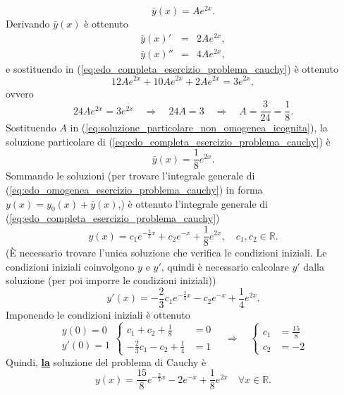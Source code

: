 \begin{example}
\begin{equation}
		\bar y(x) = A e^{2x}.
	\end{equation}
	Derivando $\bar y(x)$ è ottenuto
	\begin{equation*}
		\begin{matrix}
			\bar y(x)' &=& 2 Ae^{2x},\\
			\bar y(x)'' &=& 4Ae^{2x},
		\end{matrix}
	\end{equation*}
	e sostituendo in (\ref{eq:edo_completa_esercizio_problema_cauchy}) è ottenuto
	\begin{equation*}
		12 Ae^{2x} +10 A e^{2x} + 2Ae^{2x} = 3 e^{2x},
	\end{equation*}
	ovvero
	\begin{equation*}
		24 A e^{2x} = 3 e^{2x}\quad\Rightarrow\quad 24 A  = 3 \quad\Rightarrow\quad A=\frac{3}{24} = \frac{1}{8}.
	\end{equation*}
	Sostituendo $A$ in (\ref{eq:soluzione_particolare_non_omogenea_icognita}), la soluzione particolare di (\ref{eq:edo_completa_esercizio_problema_cauchy}) è
	\begin{equation*}
		\bar y(x) = \frac{1}{8} e^{2x}.
	\end{equation*}
	Sommando le soluzioni (per trovare l'integrale generale di (\ref{eq:edo_omogenea_esercizio_problema_cauchy}) in forma $y(x) = y_0(x) + \bar y(x)$,) è ottenuto l'integrale generale di (\ref{eq:edo_completa_esercizio_problema_cauchy})
	\begin{equation*}
		y(x)  = c_1 e^{-\frac{2}{3}x}+c_2 e^{-x}+\frac{1}{8}e^{2x},\quad c_1,c_2\in\mathbb{R}.
	\end{equation*}
	(È necessario trovare l'unica soluzione che verifica le condizioni iniziali. Le condizioni iniziali coinvolgono $y$ e $y'$, quindi è necessario calcolare $y'$ dalla soluzione (per poi imporre le condizioni iniziali))
	\begin{equation*}
		y'(x) = -\frac{2}{3} c_1 e^{-\frac{2}{3}x}  - c_2 e^{-x} + \frac{1}{4}e^{2x}.
	\end{equation*}
	Imponendo le condizioni iniziali è ottenuto
	\begin{equation*}
		\begin{matrix}
			y(0)=0\\
			y'(0)=1
		\end{matrix}
		\begin{cases}
			c_1 +c_2+ \frac{1}{8} &=0\\
			-\frac{2}{3} c_1 - c_2 + \frac{1}{4} &= 1
		\end{cases}\quad\Rightarrow\quad
		\begin{cases}
			c_1 &=\frac{15}{8}\\
			c_2 &= -2
		\end{cases}
	\end{equation*}
	Quindi, \ul{\textbf{la}} soluzione del problema di Cauchy è
	\begin{equation*}
		y(x) = \frac{15}{8} e^{-\frac{2}{3}x} - 2 e^{-x} + \frac{1}{8} e^{2x}\quad\forall x\in\mathbb{R}.
	\end{equation*}

\end{example}
